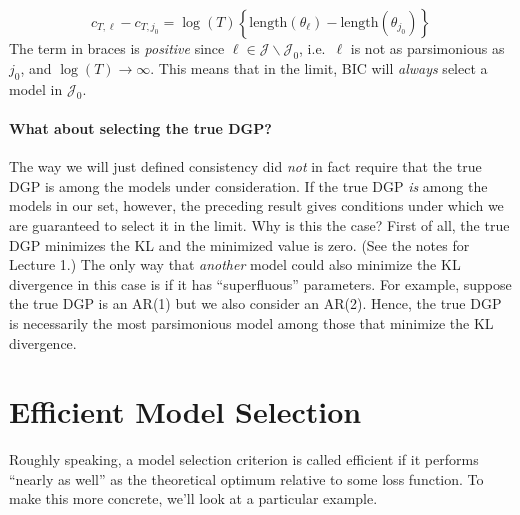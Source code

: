 	$$c_{T,\ell} - c_{T,j_0} = \log(T) \left\{\mbox{length}(\theta_\ell) - \mbox{length}(\theta_{j_0}) \right\}$$
The term in braces is \emph{positive} since $\ell \in\mathcal{J}\backslash \mathcal{J}_0$, i.e.\ $\ell$ is not as parsimonious as $j_0$, and $\log(T) \rightarrow \infty$. This means that in the limit, BIC will \emph{always} select a model in $\mathcal{J}_0$.

\paragraph{What about selecting the true DGP?}
The way we will just defined consistency did \emph{not} in fact require that the true DGP is among the models under consideration. If the true DGP \emph{is} among the models in our set, however, the preceding result gives conditions under which we are guaranteed to select it in the limit. Why is this the case? First of all, the true DGP minimizes the KL and the minimized value is zero. (See the notes for Lecture 1.) The only way that \emph{another} model could also minimize the KL divergence in this case is if it has ``superfluous'' parameters. For example, suppose the true DGP is an AR(1) but we also consider an AR(2). Hence, the true DGP is necessarily the most parsimonious model among those that minimize the KL divergence. 


\section{Efficient Model Selection}
Roughly speaking, a model selection criterion is called efficient if it performs ``nearly as well'' as the theoretical optimum relative to some loss function. To make this more concrete, we'll look at a particular example.


